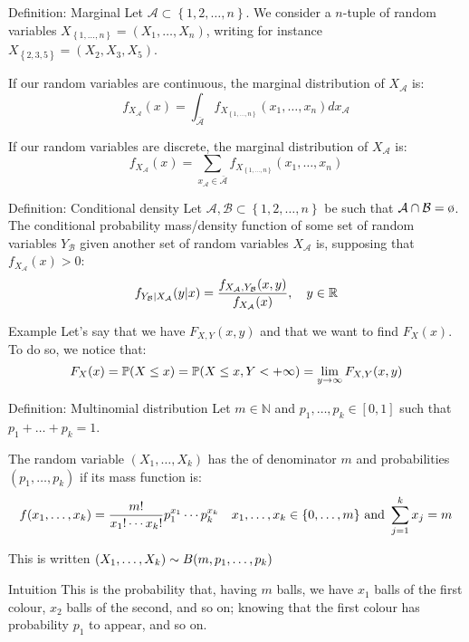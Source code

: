 \documentclass[a4paper]{article}
\begin{document}
\begin{parag}{Definition: Marginal}
    Let $\mathcal{A} \subset \left\{1, 2, \ldots, n\right\}$. We consider a $n$-tuple of random variables $X_{\left\{1, \ldots, n\right\}} = \left(X_1, \ldots, X_n\right)$, writing for instance $X_{\left\{2, 3, 5\right\}} = \left(X_2, X_3, X_5\right)$.

    If our random variables are continuous, the marginal distribution of $X_{\mathcal{A}}$ is: 
    \[f_{X_{\mathcal{A}}}\left(x\right) = \int_{\bar{\mathcal{A}}}^{} f_{X_{\left\{1, \ldots, n\right\}}}\left(x_1, \ldots, x_n\right) dx_{\mathcal{A}}\]
    
    If our random variables are discrete, the marginal distribution of $X_{\mathcal{A}}$ is: 
    \[f_{X_{\mathcal{A}}}\left(x\right) = \sum_{x_{\mathcal{A}} \in \bar{\mathcal{A}}} f_{X_{\left\{1, \ldots, n\right\}}}\left(x_1, \ldots, x_n\right)\]
\end{parag}

\begin{parag}{Definition: Conditional density}
    Let $\mathcal{A}, \mathcal{B} \subset \left\{1, 2, \ldots, n\right\}$ be such that $\mathcal{A} \cap \mathcal{B} = \o$. The conditional probability mass/density function of some set of random variables $Y_{\mathcal{B}}$ given another set of random variables $X_{\mathcal{A}}$ is, supposing that $f_{X_{\mathcal{A}}}\left(x\right) > 0$: 
    \[f_{Y_{\mathcal{B}}|X_{\mathcal{A}}}\left(y|x\right) = \frac{f_{X_{\mathcal{A}}, Y_{\mathcal{B}}}\left(x, y\right)}{f_{X_{\mathcal{A}}}\left(x\right)}, \mathspace y \in \mathbb{R}\]
\end{parag}


\begin{parag}{Example}
    Let's say that we have $F_{X, Y}\left(x, y\right)$ and that we want to find $F_{X}\left(x\right)$. To do so, we notice that: 
    \[F_{X}\left(x\right) = \prob\left(X \leq x\right) = \prob\left(X \leq x, Y < +\infty\right) = \lim_{y \to \infty} F_{X, Y}\left(x, y\right)\]
\end{parag}

\begin{parag}{Definition: Multinomial distribution}
    Let $m \in \mathbb{N}$ and $p_1, \ldots, p_k \in \left[0, 1\right]$ such that $p_1 + \ldots + p_k = 1$.

    The random variable $\left(X_1, \ldots, X_k\right)$ has the  of denominator $m$ and probabilities $\left(p_1, \ldots, p_k\right)$ if its mass function is: 
    \[f\left(x_1, \ldots, x_k\right) = \frac{m!}{x_1! \cdots x_k!} p_1^{x_1} \cdots p_k^{x_k} \mathspace x_1, \ldots, x_k \in \left\{0, \ldots, m\right\} \text{ and } \sum_{j=1}^{k} x_j = m\]

    This is written $\left(X_1, \ldots, X_k\right) \followsdistr B\left(m, p_1, \ldots, p_k\right)$

    \begin{subparag}{Intuition}
        This is the probability that, having $m$ balls, we have $x_1$ balls of the first colour, $x_2$ balls of the second, and so on; knowing that the first colour has probability $p_1$ to appear, and so on.
    \end{subparag}
\end{parag}
\end{document}
